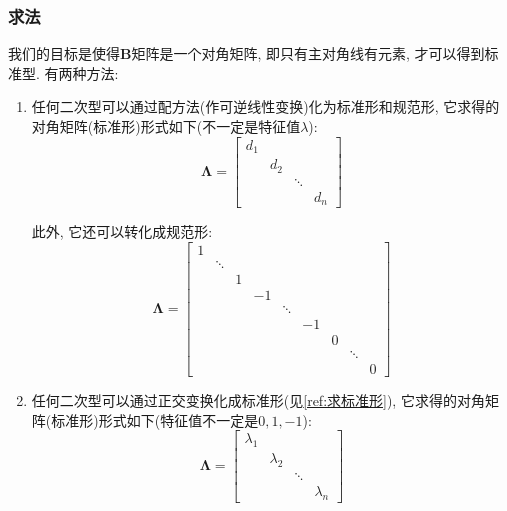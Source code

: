 \subsubsection{求法}
我们的目标是使得$ \bm{B} $矩阵是一个对角矩阵, 即只有主对角线有元素, 才可以得到标准型. 有两种方法:
\begin{enumerate}
\item 任何二次型可以通过配方法(作可逆线性变换)化为标准形和规范形, 它求得的对角矩阵(标准形)形式如下(不一定是特征值$ \lambda $):
\begin{equation*}
\bm{\Lambda}=\begin{bmatrix}
             d_1 &  &  &  \\
             & d_2 &  &  \\
             &  & \ddots &  \\
             &  &  & d_n
\end{bmatrix}
\end{equation*}\par
此外, 它还可以转化成规范形:
\begin{equation*}
\bm{\Lambda}=\begin{bmatrix}
             1 &  &  &  &  &  &  &  &  \\
             & \ddots &  &  &  &  &  &  &  \\
             &  & 1 &  &  &  &  &  &  \\
             &  &  & -1 &  &  &  &  &  \\
             &  &  &  & \ddots &  &  &  &  \\
             &  &  &  &  & -1 &  &  &  \\
             &  &  &  &  &  & 0 &  &  \\
             &  &  &  &  &  &  & \ddots &  \\
             &  &  &  &  &  &  &  & 0
\end{bmatrix}
\end{equation*}
\item 任何二次型可以通过正交变换化成标准形(见\ref{ref:求标准形}), 它求得的对角矩阵(标准形)形式如下(特征值不一定是$ 0, 1, -1 $):
\begin{equation*}
\bm{\Lambda}=\begin{bmatrix}
             \lambda_1 &  &  &  \\
             & \lambda_2 &  &  \\
             &  & \ddots &  \\
             &  &  & \lambda_n
\end{bmatrix}
\end{equation*}
\end{enumerate}
